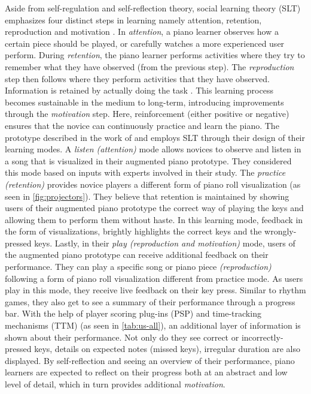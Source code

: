 \documentclass[sigconf, screen, review]{acmart}
\begin{document}
Aside from self-regulation and self-reflection theory, social learning theory (SLT) emphasizes four distinct steps in learning namely attention, retention, reproduction and motivation \cite{bandura1977social}. In \textit{attention}, a piano learner observes how a certain piece should be played, or carefully watches a more experienced user perform. During \textit{retention}, the piano learner performs activities where they try to remember what they have observed (from the previous step). The \textit{reproduction} step then follows where they perform activities that they have observed. Information is retained by actually doing the task \cite{stryker1997content}. This learning process becomes sustainable in the medium to long-term, introducing improvements through the \textit{motivation} step. Here, reinforcement (either positive or negative) ensures that the novice can continuously practice and learn the piano. The prototype described in the work of \citet{weing2013piano} and \citet{rogers2014piano} employs SLT through their design of their learning modes. A \textit{listen (attention)} mode allows novices to observe and listen in a song that is visualized in their augmented piano prototype. They considered this mode based on inputs with experts involved in their study. The \textit{practice (retention)} provides novice players a different form of piano roll visualization (as seen in \autoref{fig:projectors}). They believe that retention is maintained by showing users of their augmented piano prototype the correct way of playing the keys and allowing them to perform them without haste. In this learning mode, feedback in the form of visualizations, brightly highlights the correct keys and the wrongly-pressed keys. Lastly, in their \textit{play (reproduction and motivation)} mode, users of the augmented piano prototype can receive additional feedback on their performance. They can play a specific song or piano piece \textit{(reproduction)} following a form of piano roll visualization different from practice mode. As users play in this mode, they receive live feedback on their key press. Similar to rhythm games, they also get to see a summary of their performance through a progress bar. With the help of player scoring plug-ins (PSP) and time-tracking mechanisms (TTM) (as seen in \autoref{tab:us-all}), an additional layer of information is shown about their performance. Not only do they see correct or incorrectly-pressed keys, details on expected notes (missed keys), irregular duration are also displayed. By self-reflection and seeing an overview of their performance, piano learners are expected to reflect on their progress both at an abstract and low level of detail, which in turn provides additional \textit{motivation}. 
\end{document}
